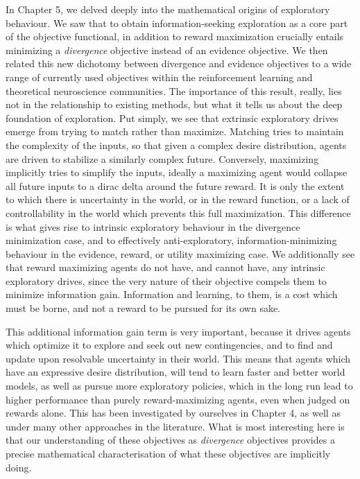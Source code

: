 In Chapter 5, we delved deeply into the mathematical origins of exploratory behaviour. We saw that to obtain information-seeking exploration as a core part of the objective functional, in addition to reward maximization crucially entails minimizing a \emph{divergence} objective instead of an evidence objective. We then related this new dichotomy between divergence and evidence objectives to a wide range of currently used objectives within the reinforcement learning and theoretical neuroscience communities. The importance of this result, really, lies not in the relationship to existing methods, but what it tells us about the deep foundation of exploration. Put simply, we see that extrinsic exploratory drives emerge from trying to match rather than maximize. Matching tries to maintain the complexity of the inputs, so that given a complex desire distribution, agents are driven to stabilize a similarly complex future. Conversely, maximizing implicitly tries to simplify the inputs, ideally a maximizing agent would collapse all future inputs to a dirac delta around the future reward. It is only the extent to which there is uncertainty in the world, or in the reward function, or a lack of controllability in the world which prevents this full maximization. This difference is what gives rise to intrinsic exploratory behaviour in the divergence minimization case, and to effectively anti-exploratory, information-minimizing behaviour in the evidence, reward, or utility maximizing case. We additionally see that reward maximizing agents do not have, and cannot have, any intrinsic exploratory drives, since the very nature of their objective compels them to minimize information gain. Information and learning, to them, is a cost which must be borne, and not a reward to be pursued for its own sake.

This additional information gain term is very important, because it drives agents which optimize it to explore and seek out new contingencies, and to find and update upon resolvable uncertainty in their world. This means that agents which have an expressive desire distribution, will tend to learn faster and better world models, as well as pursue more exploratory policies, which in the long run lead to higher performance than purely reward-maximizing agents, even when judged on rewards alone. This has been investigated by ourselves in Chapter 4, as well as under many other approaches in the literature. What is most interesting here is that our understanding of these objectives as \emph{divergence} objectives provides a precise mathematical characterisation of what these objectives are implicitly doing.

